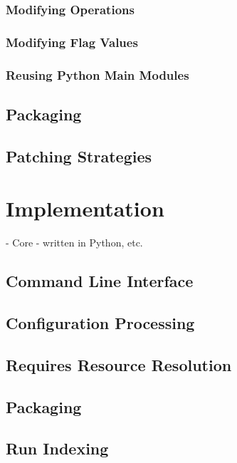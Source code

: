 \documentclass{article}
\begin{document}
\subsubsection{Modifying Operations}

\subsubsection{Modifying Flag Values}

\subsubsection{Reusing Python Main Modules}

\subsection{Packaging}

\subsection{Patching Strategies}

\section{Implementation}

- Core - written in Python, etc.

\subsection{Command Line Interface}

\subsection{Configuration Processing}

\subsection{Requires Resource Resolution}

\subsection{Packaging}

\subsection{Run Indexing}
\end{document}
